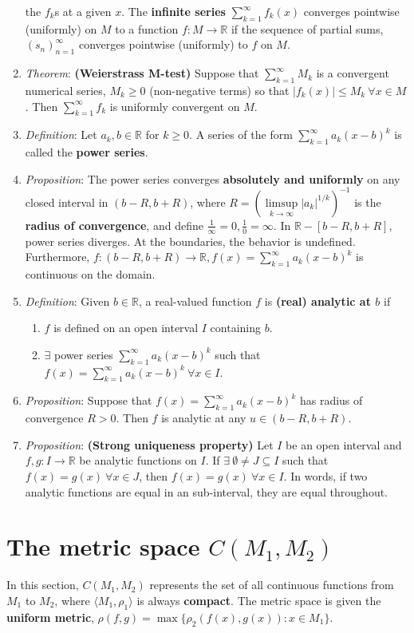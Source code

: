 \documentclass[10pt]{article}
\newcommand{\seqn}[1]{(#1)^\infty_{n=1}}
\newcommand{\infsrsk}[1]{\sum\limits^\infty_{k=1}#1}
\newcommand{\real}{\mathbb{R}}
\newcommand{\cmm}{C(M_1,M_2)}
\newcommand{\met}[1]{\langle M_{#1},\rho_{#1}\rangle}
\begin{document}
\begin{multicols*}{3}
\begin{enumerate}
			the $f_{k}$s at a given $x$. The \textbf{infinite series}
			$\infsrsk{f_{k}(x)}$ converges pointwise (uniformly) on $M$ to a function
			$f:M\to\real$ if the sequence of partial sums, $\seqn{s_{n}}$ converges
			pointwise (uniformly) to $f$ on $M$.
		\item \emph{Theorem}: \textbf{(Weierstrass M-test)} Suppose that
			$\infsrsk{M_{k}}$ is a convergent numerical series, $M_{k}\geq 0$
			(non-negative terms) so that $|f_{k}(x)|\leq M_{k}\ \forall x\in M$. Then
			$\infsrsk{f_{k}}$ is uniformly convergent on $M$.
		\item \emph{Definition}: Let $a_{k},b\in\real$ for $k\geq 0$. A series of
		the form $\infsrsk{a_{k}(x-b)^{k}}$ is called the \textbf{power series}.
		\item \emph{Proposition}: The power series converges \textbf{absolutely and
			uniformly} on any closed interval in $(b-R,b+R)$, where
			$R=(\limsup\limits_{k\to\infty}|a_{k}|^{1/k})^{-1}$ is the \textbf{radius
			of convergence}, and define $\frac{1}{\infty}=0, \frac{1}{0}=\infty$. In
			$\real-[b-R,b+R]$, power series diverges. At the boundaries, the behavior
			is undefined. Furthermore, $f:(b-R,b+R)\to\real,f(x)=\infsrsk{a_{k}(x-b)^{k}}$ is
			continuous on the domain.
			\item \emph{Definition}: Given $b\in\real$, a real-valued function
			$f$ is \textbf{(real) analytic at $b$} if
			\begin{enumerate}
				\item $f$ is defined on an open interval $I$ containing $b$.
				\item $\exists$ power series $\infsrsk{a_{k}(x-b)^{k}}$ such that
				$f(x)=\infsrsk{a_k}(x-b)^{k}\ \forall x\in I$.
			\end{enumerate}
			\item \emph{Proposition}: Suppose that $f(x)=\infsrsk{a_{k}(x-b)^{k}}$ has
			radius of convergence $R>0$. Then $f$ is analytic at any $u\in(b-R,b+R)$.
			\item \emph{Proposition}: \textbf{(Strong uniqueness property)} Let $I$ be
			an open interval and $f,g:I\to\real$ be analytic functions on $I$. If
			$\exists\ \emptyset\neq J\subseteq I$ such that $f(x)=g(x)\ \forall x\in J$,
			then $f(x)=g(x)\ \forall x\in I$. In words, if two analytic functions are
			equal in an sub-interval, they are equal throughout.
	\end{enumerate}

	\section{The metric space $\cmm$}
	In this section, $C(M_{1},M_{2})$ represents the set of all continuous
	functions from $M_{1}$ to $M_{2}$, where $\met{1}$ is always \textbf{compact}.
	The metric space is given the \textbf{uniform metric},
	$\rho(f,g)=\max\{\rho_{2}(f(x),g(x)):x\in M_{1}\}$.


\end{multicols*}
\end{document}
